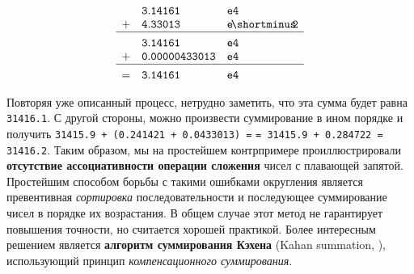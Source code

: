\documentclass{article}
\theoremstyle{definition}
\begin{document}
\begin{wrapfigure}{r}{0.3\textwidth} \vspace{-10pt}
\begin{equation*}
\begin{array}{l l l}
& \mathtt{3.14161} & \mathtt{e4} \\
\mathtt{+} & \mathtt{4.33013} & \mathtt{e\!\shortminus\!\!2} \\ \hline \\[-8pt]
& \mathtt{3.14161} & \mathtt{e4} \\
\mathtt{+} & \mathtt{0.00000433013} & \mathtt{e4} \\ \hline  \\[-8pt]
\mathtt{=} & \mathtt{3.14161} & \mathtt{e4}
\end{array}
\end{equation*}
\vspace{-10pt}
\end{wrapfigure}
Повторяя уже описанный процесс, нетрудно заметить, что эта сумма будет равна \verb_31416.1_. С другой стороны, можно произвести суммирование в ином порядке и получить \verb_31415.9 + (0.241421 + 0.0433013) =_ \verb_= 31415.9 + 0.284722 = 31416.2_. Таким образом, мы на простейшем контрпримере проиллюстрировали \textbf{отсутствие ассоциативности операции сложения} чисел с плавающей запятой.\\
Простейшим способом борьбы с такими ошибками округления является превентивная \textit{сортировка} последовательности и последующее суммирование чисел в порядке их возрастания. В общем случае этот метод не гарантирует повышения точности, но считается хорошей практикой. Более интересным решением является \textbf{алгоритм суммирования Кэхена} (Kahan summation, \cite{Kahan}), использующий принцип \textit{компенсационного суммирования}.\vspace{-7pt}
\end{document}
